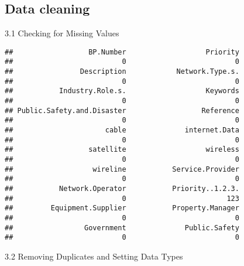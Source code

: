 \documentclass[
]{article}
\newenvironment{Shaded}{\begin{snugshade}}{\end{snugshade}}
\newcommand{\CommentTok}[1]{\textcolor[rgb]{0.56,0.35,0.01}{\textit{#1}}}
\newcommand{\FunctionTok}[1]{\textcolor[rgb]{0.13,0.29,0.53}{\textbf{#1}}}
\newcommand{\NormalTok}[1]{#1}
\newcommand{\OtherTok}[1]{\textcolor[rgb]{0.56,0.35,0.01}{#1}}
\newcommand{\SpecialCharTok}[1]{\textcolor[rgb]{0.81,0.36,0.00}{\textbf{#1}}}
\begin{document}
\hypertarget{data-cleaning}{%
\subsection{Data cleaning}\label{data-cleaning}}

3.1 Checking for Missing Values

\begin{verbatim}
##                  BP.Number                   Priority 
##                          0                          0 
##                Description            Network.Type.s. 
##                          0                          0 
##           Industry.Role.s.                   Keywords 
##                          0                          0 
## Public.Safety.and.Disaster                  Reference 
##                          0                          0 
##                      cable              internet.Data 
##                          0                          0 
##                  satellite                   wireless 
##                          0                          0 
##                   wireline           Service.Provider 
##                          0                          0 
##           Network.Operator           Priority..1.2.3. 
##                          0                        123 
##         Equipment.Supplier           Property.Manager 
##                          0                          0 
##                 Government              Public.Safety 
##                          0                          0
\end{verbatim}

3.2 Removing Duplicates and Setting Data Types

\begin{Shaded}
\end{Shaded}
\end{document}
